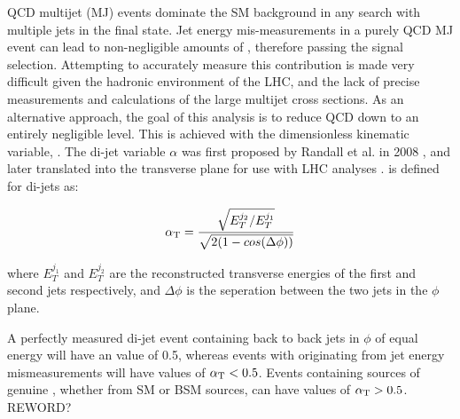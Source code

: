 QCD multijet (MJ) events dominate the SM background in any search with multiple jets 
in the final state. Jet energy mis-measurements in a 
purely QCD MJ event can lead to non-negligible amounts of \mht, therefore 
passing the signal selection. Attempting
to accurately measure this contribution is
made very difficult given the hadronic environment of the LHC, and the lack of 
precise measurements and calculations of the large multijet cross sections. As an 
alternative approach, the goal of this analysis is to reduce QCD down to an
entirely negligible level. This is 
achieved with the dimensionless kinematic variable, \alphat. The di-jet variable
$\alpha$ was first proposed by Randall et al. in 2008 \cite{Randall:2008rw},
and later translated into the transverse plane for use with LHC analyses
\cite{CMS:2008vya, CMS-PAS-SUS-09-001}.
\alphat is defined for di-jets as:

\begin{equation}
\alpha_{\text{T}} = \frac{ \sqrt{E_T^{j_2}/E_T^{j_1}} }{ \sqrt{2(1-cos(\Delta \phi))} }
\label{eq:alphat_di-jet}
\end{equation}

where $E_T^{j_1}$ and $E_T^{j_2}$ are the reconstructed transverse energies of 
the first and second jets respectively, and $\Delta \phi$ is the seperation 
between the two jets in the $\phi$ plane.

A perfectly measured di-jet event containing back to back jets in $\phi$ of equal energy will
have an \alphat value of 0.5, whereas 
events with \met originating from jet energy mismeasurements will have values of $\alpha_{\text{T}}<0.5$.
Events containing sources of genuine \met, whether from SM or BSM sources, can have values
of $\alpha_{\text{T}} > 0.5$. REWORD?





